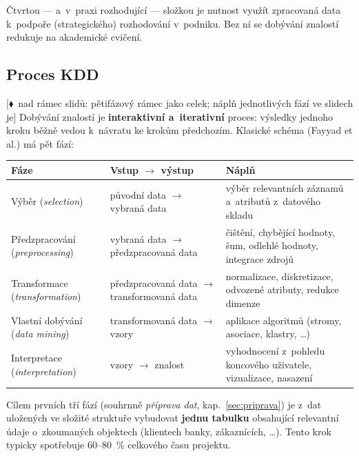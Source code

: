 \documentclass[11pt,a4paper]{article}
\theoremstyle{definition}
\newcommand{\mimoq}[1]{\textcolor{markcol}{\textsf{\footnotesize[$\blacklozenge$~nad rámec slidů: #1]}}}
\begin{document}
Čtvrtou --- a~v~praxi rozhodující --- složkou je nutnost využít zpracovaná data k~podpoře
(strategického) rozhodování v~podniku. Bez ní se dobývání znalostí redukuje na akademické
cvičení.

\subsection{Proces KDD}

\mimoq{pětifázový rámec jako celek; náplň jednotlivých fází ve slidech je}
Dobývání znalostí je \textbf{interaktivní a~iterativní} proces: výsledky jednoho
kroku běžně vedou k~návratu ke krokům předchozím. Klasické schéma (Fayyad et al.) má pět
fází:

\begin{center}
\small
\begin{tabular}{@{}p{3.3cm}p{4.2cm}p{7.6cm}@{}}
\toprule
\textbf{Fáze} & \textbf{Vstup $\to$ výstup} & \textbf{Náplň} \\
\midrule
Výběr (\emph{selection}) & původní data $\to$ vybraná data & výběr relevantních záznamů
  a~atributů z~datového skladu \\
Předzpracování (\emph{preprocessing}) & vybraná data $\to$ předzpracovaná data & čištění,
  chybějící hodnoty, šum, odlehlé hodnoty, integrace zdrojů \\
Transformace (\emph{transformation}) & předzpracovaná data $\to$ transformovaná data &
  normalizace, diskretizace, odvozené atributy, redukce dimenze \\
Vlastní dobývání (\emph{data mining}) & transformovaná data $\to$ vzory & aplikace
  algoritmů (stromy, asociace, klastry, \dots) \\
Interpretace (\emph{interpretation}) & vzory $\to$ znalost & vyhodnocení z~pohledu
  koncového uživatele, vizualizace, nasazení \\
\bottomrule
\end{tabular}
\end{center}

Cílem prvních tří fází (souhrnně \emph{příprava dat}, kap.~\ref{sec:priprava}) je z~dat
uložených ve složité struktuře vybudovat \textbf{jednu tabulku} obsahující relevantní údaje
o~zkoumaných objektech (klientech banky, zákaznících, \dots). Tento krok typicky spotřebuje
60--80~\% celkového času projektu.
\end{document}
